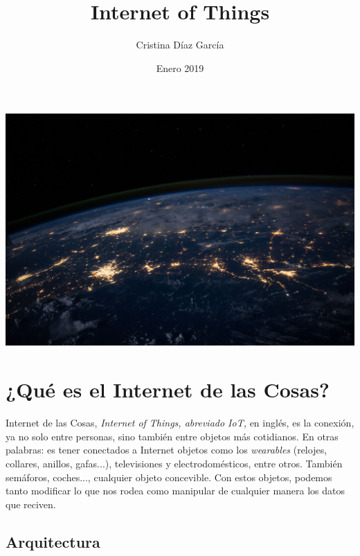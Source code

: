 \documentclass{article}
\title{Internet of Things}
\author{Cristina Díaz García}
\date{Enero 2019}
\begin{document}

\begin{titlingpage}
\maketitle

\begin{center}
\includegraphics[scale=0.07]{images/iot.jpg} 
\end{center}

\end{titlingpage}

\newpage

\tableofcontents

\newpage

\section{¿Qué es el Internet de las Cosas?}

Internet de las Cosas, \textit{Internet of Things, abreviado IoT,} en inglés, es la conexión, ya no solo entre personas, sino también entre objetos más cotidianos. En otras palabras: es tener conectados a Internet objetos como los \textit{wearables} (relojes, collares, anillos, gafas...), televisiones y electrodomésticos, entre otros. También semáforos, coches..., cualquier objeto concevible. Con estos objetos, podemos tanto modificar lo que nos rodea como manipular de cualquier manera los datos que reciven.

\subsection{Arquitectura}
\end{document}
